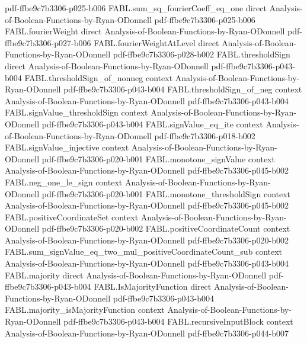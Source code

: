 \begin{theorem}
  {pdf-ffbe9c7b3306-p025-b006}
\proofstep
  {FABL.sum_sq_fourierCoeff_eq_one}
  {direct}
  {Analysis-of-Boolean-Functions-by-Ryan-ODonnell}
  {pdf-ffbe9c7b3306-p025-b006}
\proofstep
  {FABL.fourierWeight}
  {direct}
  {Analysis-of-Boolean-Functions-by-Ryan-ODonnell}
  {pdf-ffbe9c7b3306-p027-b006}
\proofstep
  {FABL.fourierWeightAtLevel}
  {direct}
  {Analysis-of-Boolean-Functions-by-Ryan-ODonnell}
  {pdf-ffbe9c7b3306-p028-b002}
\proofstep
  {FABL.thresholdSign}
  {direct}
  {Analysis-of-Boolean-Functions-by-Ryan-ODonnell}
  {pdf-ffbe9c7b3306-p043-b004}
\proofstep
  {FABL.thresholdSign_of_nonneg}
  {context}
  {Analysis-of-Boolean-Functions-by-Ryan-ODonnell}
  {pdf-ffbe9c7b3306-p043-b004}
\proofstep
  {FABL.thresholdSign_of_neg}
  {context}
  {Analysis-of-Boolean-Functions-by-Ryan-ODonnell}
  {pdf-ffbe9c7b3306-p043-b004}
\proofstep
  {FABL.signValue_thresholdSign}
  {context}
  {Analysis-of-Boolean-Functions-by-Ryan-ODonnell}
  {pdf-ffbe9c7b3306-p043-b004}
\proofstep
  {FABL.signValue_eq_ite}
  {context}
  {Analysis-of-Boolean-Functions-by-Ryan-ODonnell}
  {pdf-ffbe9c7b3306-p018-b002}
\proofstep
  {FABL.signValue_injective}
  {context}
  {Analysis-of-Boolean-Functions-by-Ryan-ODonnell}
  {pdf-ffbe9c7b3306-p020-b001}
\proofstep
  {FABL.monotone_signValue}
  {context}
  {Analysis-of-Boolean-Functions-by-Ryan-ODonnell}
  {pdf-ffbe9c7b3306-p045-b002}
\proofstep
  {FABL.neg_one_le_sign}
  {context}
  {Analysis-of-Boolean-Functions-by-Ryan-ODonnell}
  {pdf-ffbe9c7b3306-p020-b001}
\proofstep
  {FABL.monotone_thresholdSign}
  {context}
  {Analysis-of-Boolean-Functions-by-Ryan-ODonnell}
  {pdf-ffbe9c7b3306-p045-b002}
\proofstep
  {FABL.positiveCoordinateSet}
  {context}
  {Analysis-of-Boolean-Functions-by-Ryan-ODonnell}
  {pdf-ffbe9c7b3306-p020-b002}
\proofstep
  {FABL.positiveCoordinateCount}
  {context}
  {Analysis-of-Boolean-Functions-by-Ryan-ODonnell}
  {pdf-ffbe9c7b3306-p020-b002}
\proofstep
  {FABL.sum_signValue_eq_two_mul_positiveCoordinateCount_sub}
  {context}
  {Analysis-of-Boolean-Functions-by-Ryan-ODonnell}
  {pdf-ffbe9c7b3306-p043-b004}
\proofstep
  {FABL.majority}
  {direct}
  {Analysis-of-Boolean-Functions-by-Ryan-ODonnell}
  {pdf-ffbe9c7b3306-p043-b004}
\proofstep
  {FABL.IsMajorityFunction}
  {direct}
  {Analysis-of-Boolean-Functions-by-Ryan-ODonnell}
  {pdf-ffbe9c7b3306-p043-b004}
\proofstep
  {FABL.majority_isMajorityFunction}
  {context}
  {Analysis-of-Boolean-Functions-by-Ryan-ODonnell}
  {pdf-ffbe9c7b3306-p043-b004}
\proofstep
  {FABL.recursiveInputBlock}
  {context}
  {Analysis-of-Boolean-Functions-by-Ryan-ODonnell}
  {pdf-ffbe9c7b3306-p044-b007}

\end{theorem}
